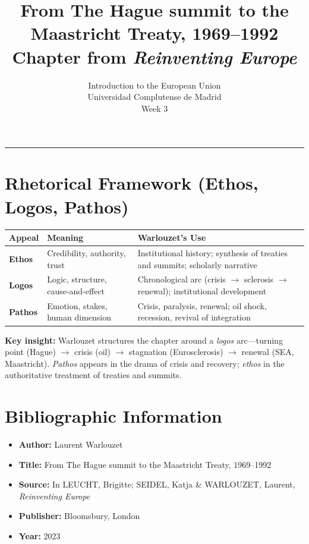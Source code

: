 \documentclass[11pt,a4paper]{article}
\begin{document}
\title{From The Hague summit to the Maastricht Treaty, 1969--1992\\Chapter from \textit{Reinventing Europe}}
\author{Introduction to the European Union\\Universidad Complutense de Madrid\\Week 3}
\date{}
\maketitle
\vspace{-1em}
\hrule
\vspace{1em}

\section*{Rhetorical Framework (Ethos, Logos, Pathos)}

\begin{table}[h]
\centering
\begin{tabular}{@{}lll@{}}
\toprule
\textbf{Appeal} & \textbf{Meaning} & \textbf{Warlouzet's Use} \\
\midrule
\textbf{Ethos} & Credibility, authority, trust & Institutional history; synthesis of treaties and summits; scholarly narrative \\
\textbf{Logos} & Logic, structure, cause-and-effect & Chronological arc (crisis $\to$ sclerosis $\to$ renewal); institutional development \\
\textbf{Pathos} & Emotion, stakes, human dimension & Crisis, paralysis, renewal; oil shock, recession, revival of integration \\
\bottomrule
\end{tabular}
\end{table}

\textbf{Key insight:} Warlouzet structures the chapter around a \textit{logos} arc---turning point (Hague) $\to$ crisis (oil) $\to$ stagnation (Eurosclerosis) $\to$ renewal (SEA, Maastricht). \textit{Pathos} appears in the drama of crisis and recovery; \textit{ethos} in the authoritative treatment of treaties and summits.

\section*{Bibliographic Information}

\begin{itemize}
\item \textbf{Author:} Laurent Warlouzet
\item \textbf{Title:} From The Hague summit to the Maastricht Treaty, 1969--1992
\item \textbf{Source:} In LEUCHT, Brigitte; SEIDEL, Katja \& WARLOUZET, Laurent, \textit{Reinventing Europe}
\item \textbf{Publisher:} Bloomsbury, London
\item \textbf{Year:} 2023
\end{itemize}
\end{document}
